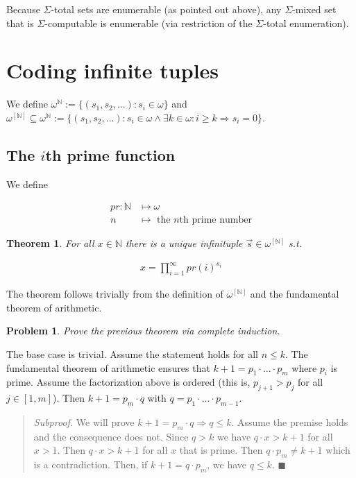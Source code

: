 \documentclass[a4paper, 12pt]{article}
\newtheorem{problem}{Problem}
\newtheorem{theorem}{Theorem}
\newtheorem{problem}{Problem}
\newtheorem{theorem}{Theorem}
\begin{document}
Because $\Sigma$-total sets are enumerable (as pointed out above), any
$\Sigma$-mixed set that is $\Sigma$-computable is enumerable (via restriction
of the $\Sigma$-total enumeration).

\section{Coding infinite tuples}

We define $\omega^{\mathbb{N}} := \{ (s_1, s_2, \ldots) : s_i \in \omega \}$ and
$\omega^{\left[ \mathbb{N} \right] } \subseteq \omega^{\mathbb{N}} := \{(s_1,
s_2, \ldots) : s_i \in \omega \land \exists k \in \omega : i \geq k
\Rightarrow s_i = 0\}$. 

\subsection{The $i$th prime function}

We define 

\begin{align*}
    pr : \mathbb{N} &\mapsto \omega  \\ 
    n &\mapsto \text{ the $n$th prime number}
\end{align*}

\begin{theorem}
    For all $x \in \mathbb{N}$ there is a unique infinituple $\overrightarrow{s}
    \in \omega^{[\mathbb{N}]}$ s.t. 

    \begin{align*}
        x = \prod_{i=1}^{\infty} pr(i)^{s_i}
    \end{align*}
\end{theorem}

The theorem follows trivially from the definition of $\omega^{[\mathbb{N}]}$ and
the fundamental theorem of arithmetic. 

\begin{problem}
    Prove the previous theorem via complete induction.
\end{problem}

The base case is trivial. Assume the statement holds for all $n \leq k$. The
fundamental theorem of arithmetic ensures that $k + 1 = p_1 \cdot \ldots \cdot
p_m$ where $p_i$ is prime. Assume the factorization above is ordered (this is,
$p_{j + 1} > p_j$ for all $j \in [1, m]$). Then $k + 1 = p_m \cdot q$ with $q =
p_1 \cdot \ldots \cdot p_{m - 1}$. 

\small
\begin{quote}
    \textit{Subproof.} We will prove $k + 1 = p_m \cdot q \Rightarrow q \leq k$.
    Assume the premise holds and the consequence does not. Since $q > k$ we have
    $q \cdot x > k + 1$ for all $x > 1$. Then $q \cdot x > k + 1$ for all $x$
    that is prime. Then $q \cdot p_m \neq k + 1$ which is a contradiction. Then,
    if $k + 1 = q \cdot p_m$, we have $q \leq k$. $\blacksquare$
\end{quote}
\normalsize
\end{document}
